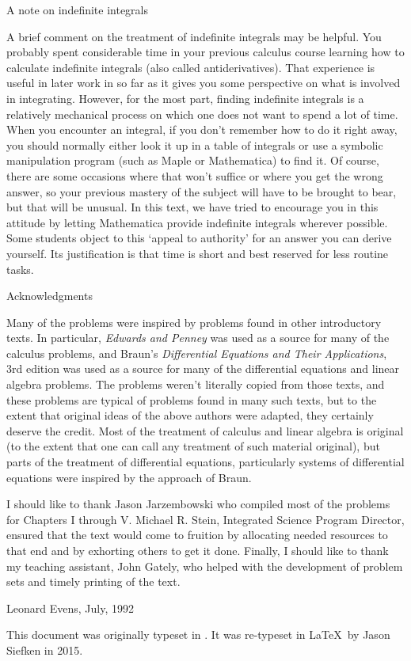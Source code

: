 \medskip
\subhead A note on indefinite integrals\endsubhead
\smallskip

A brief comment on the treatment of indefinite integrals may
be helpful.  You probably spent considerable time in your
previous calculus course learning how to calculate indefinite
integrals (also called antiderivatives).   That experience is
useful in later work in so far as it gives you some perspective
on what is involved in integrating.  However, for the most part,
finding indefinite integrals is a relatively mechanical process
on which one does not want to spend a lot of time.   When you
encounter an integral, if you don't remember how to do it right
away, you should normally either look it up in a table of integrals
or use a symbolic manipulation program (such as Maple or
Mathematica) to find it.   Of course, there are some occasions
where that won't suffice or where you get the wrong answer,
so your previous mastery of the subject will have to be brought
to bear, but that will be unusual.   In this text, we have
tried to encourage you in this attitude by letting Mathematica
provide indefinite integrals wherever possible.  Some students
object to this `appeal to authority' for an answer you can
derive yourself.   Its justification is
 that time is short and best reserved for less
routine tasks.

\medskip
\subhead Acknowledgments \endsubhead
\smallskip

Many of the problems were inspired by problems found in other introductory
texts.   In particular, {\it Edwards and Penney\/}
 was used as a source for
many of the calculus problems, and  Braun's {\it Differential Equations and Their
Applications\/}, 3rd edition was used as a source for many of the
differential equations and linear algebra problems.   The problems
weren't literally copied from those texts, and these problems
are typical of problems found in many such texts, but to the extent
that original ideas of the above authors were adapted, they certainly
deserve the credit.   Most of the treatment of calculus and linear
algebra is original (to the extent that one can call any treatment of
such material original), but parts of
the treatment of differential equations,
particularly systems of differential equations were inspired by the
approach of Braun.

I should like to thank
Jason Jarzembowski who compiled most of the problems for Chapters I through
V.   Michael R. Stein, Integrated Science Program Director, ensured that
the text would come to fruition by allocating needed resources to that end
and by exhorting others to get it done.   Finally, I should like to thank
my teaching assistant, John Gately, who helped with the development of
problem sets and
timely printing of the text.

\medskip

\hfill Leonard Evens,  July, 1992

This document was originally typeset in \AmSTeX.  It was 
re-typeset in \LaTeX\ by Jason Siefken in 2015.

\endinput
